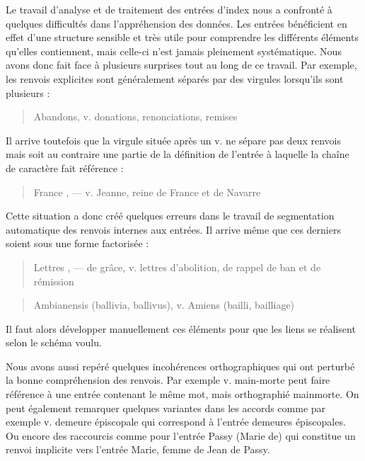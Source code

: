 \documentclass[a4paper,12pt,twoside]{book}
\begin{document}
	Le travail d'analyse et de traitement des entrées d'index nous a confronté à quelques difficultés dans l'appréhension des données. Les entrées bénéficient en effet d'une structure sensible et très utile pour comprendre les différents éléments qu'elles contiennent, mais celle-ci n'est jamais pleinement systématique. Nous avons donc fait face à plusieurs surprises tout au long de ce travail. Par exemple, les renvois explicites sont généralement séparés par des virgules lorsqu'ils sont plusieurs :
	
	\begin{quotation}
		Abandons, v. donations, renonciations, remises
	\end{quotation}

	\noindent Il arrive toutefois que la virgule située après un \og v.\fg{} ne sépare pas deux renvois mais soit au contraire une partie de la définition de l'entrée à laquelle la chaîne de caractère fait référence :
	
	\begin{quotation}
		France , — v. Jeanne, reine de France et de Navarre
	\end{quotation}

	\noindent Cette situation a donc créé quelques erreurs dans le travail de segmentation automatique des renvois internes aux entrées. Il arrive même que ces derniers soient sous une forme factorisée :
	
	\begin{quotation}
		Lettres , — de grâce, v. lettres d'abolition, de rappel de
			ban et de rémission
	\end{quotation}

	\begin{quotation}
		Ambianensis (ballivia, ballivus), v. Amiens (bailli, bailliage)
	\end{quotation}

	\noindent Il faut alors développer manuellement ces éléments pour que les liens se réalisent selon le schéma voulu.
	
	Nous avons aussi repéré quelques incohérences orthographiques qui ont perturbé la bonne compréhension des renvois. Par exemple \og v. main-morte\fg{} peut faire référence à une entrée contenant le même mot, mais orthographié \og mainmorte\fg{}. On peut également remarquer quelques variantes dans les accords comme par exemple \og v. demeure épiscopale\fg{} qui correspond à l'entrée \og demeures épiscopales\fg{}. Ou encore des raccourcis comme pour l'entrée \og Passy (Marie de)\fg{} qui constitue un renvoi implicite vers l'entrée \og Marie, femme de Jean de Passy\fg{}. 
	
\end{document}
